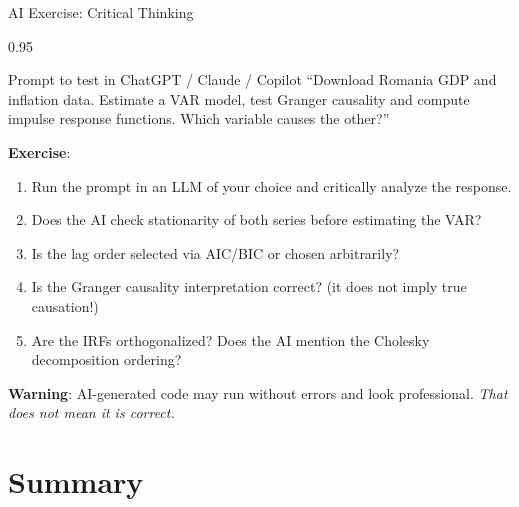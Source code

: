 \documentclass[9pt, aspectratio=169, t]{beamer}
\begin{document}
\begin{frame}{AI Exercise: Critical Thinking}
    \begin{cminipage}{0.95\textwidth}
    \vspace{-0.3cm}
    \begin{block}{\footnotesize Prompt to test in ChatGPT / Claude / Copilot}
        {\footnotesize
        ``Download Romania GDP and inflation data. Estimate a VAR model, test Granger causality and compute impulse response functions. Which variable causes the other?''
        }
    \end{block}
    \vspace{-2mm}
    {\footnotesize
    \textbf{Exercise}:
    \begin{enumerate}\setlength{\itemsep}{0pt}
        \item Run the prompt in an LLM of your choice and critically analyze the response.
        \item Does the AI check stationarity of both series before estimating the VAR?
        \item Is the lag order selected via AIC/BIC or chosen arbitrarily?
        \item Is the Granger causality interpretation correct? (it does not imply true causation!)
        \item Are the IRFs orthogonalized? Does the AI mention the Cholesky decomposition ordering?
    \end{enumerate}
    }
    \vspace{-2mm}
    \begin{alertblock}{}
        {\footnotesize \textbf{Warning}: AI-generated code may run without errors and look professional. \textit{That does not mean it is correct.}}
    \end{alertblock}
    \end{cminipage}
\end{frame}

\section{Summary}
\end{document}
